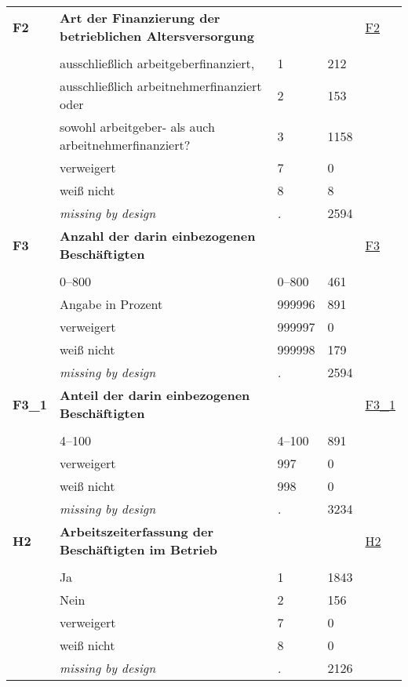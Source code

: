 \begin{longtable}{| L{2.65cm} | L{8cm} | C{1.5cm} | R{1.25cm} | C{2.25cm}  |}
   \midrule
\textbf{F2}\label{var:F2} & \textbf{Art der Finanzierung der betrieblichen Altersversorgung} &  &  & \hyperref[F2]{F2} \\ 
   &  &  &  &  \\ 
   & ausschließlich arbeitgeberfinanziert, & 1 & 212 &  \\ 
   & ausschließlich arbeitnehmerfinanziert oder & 2 & 153 &  \\ 
   & sowohl arbeitgeber- als auch arbeitnehmerfinanziert? & 3 & 1158 &  \\ 
   & verweigert & 7 & 0 &  \\ 
   & weiß nicht & 8 & 8 &  \\ 
   & \textit{missing by design} & \textit{.} & 2594 &  \\ 
   \midrule
\textbf{F3}\label{var:F3} & \textbf{Anzahl der darin einbezogenen Beschäftigten} &  &  & \hyperref[F3]{F3} \\ 
   &  &  &  &  \\ 
   & 0--800 & 0--800 & 461 &  \\ 
   & Angabe in Prozent & 999996 & 891 &  \\ 
   & verweigert & 999997 & 0 &  \\ 
   & weiß nicht & 999998 & 179 &  \\ 
   & \textit{missing by design} & \textit{.} & 2594 &  \\ 
   \midrule
\textbf{F3\_1}\label{var:F3:1} & \textbf{Anteil der darin einbezogenen Beschäftigten} &  &  & \hyperref[F3:1]{F3\_1} \\ 
   &  &  &  &  \\ 
   & 4--100 & 4--100 & 891 &  \\ 
   & verweigert & 997 & 0 &  \\ 
   & weiß nicht & 998 & 0 &  \\ 
   & \textit{missing by design} & \textit{.} & 3234 &  \\ 
   \midrule
\textbf{H2}\label{var:H2} & \textbf{Arbeitszeiterfassung der Beschäftigten im Betrieb} &  &  & \hyperref[H2]{H2} \\ 
   &  &  &  &  \\ 
   & Ja & 1 & 1843 &  \\ 
   & Nein & 2 & 156 &  \\ 
   & verweigert & 7 & 0 &  \\ 
   & weiß nicht & 8 & 0 &  \\ 
   & \textit{missing by design} & \textit{.} & 2126 &  \\ 

\end{longtable}
